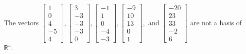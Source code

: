 \begin{exercise}
\begin{exerciseStatement}
  \end{exerciseStatement}
  \begin{exerciseAnswer}
   The vectors \(\left[\begin{array}{r}
1 \\
0 \\
4 \\
-5 \\
4
\end{array}\right] , \left[\begin{array}{r}
3 \\
-3 \\
-3 \\
-3 \\
0
\end{array}\right] , \left[\begin{array}{r}
-1 \\
1 \\
0 \\
-4 \\
-3
\end{array}\right] , \left[\begin{array}{r}
-9 \\
10 \\
13 \\
0 \\
1
\end{array}\right] , \text{ and } \left[\begin{array}{r}
-20 \\
23 \\
33 \\
-2 \\
6
\end{array}\right]\) 
  	 are not  a basis of \(\mathbb{R}^5\).
  


  \end{exerciseAnswer}
\end{exercise}